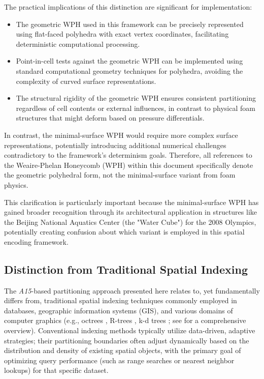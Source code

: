 \documentclass[10pt]{article}
\def\AAAB{\textit{A15}}
\begin{document}
The practical implications of this distinction are significant for implementation:
\begin{itemize}
    \item The geometric WPH used in this framework can be precisely represented using flat-faced polyhedra with exact vertex coordinates, facilitating deterministic computational processing.
    \item Point-in-cell tests against the geometric WPH can be implemented using standard computational geometry techniques for polyhedra, avoiding the complexity of curved surface representations.
    \item The structural rigidity of the geometric WPH ensures consistent partitioning regardless of cell contents or external influences, in contrast to physical foam structures that might deform based on pressure differentials.
\end{itemize}

In contrast, the minimal-surface WPH would require more complex surface representations, potentially introducing additional numerical challenges contradictory to the framework's determinism goals. Therefore, all references to the Weaire-Phelan Honeycomb (WPH) within this document specifically denote the geometric polyhedral form, not the minimal-surface variant from foam physics.

This clarification is particularly important because the minimal-surface WPH has gained broader recognition through its architectural application in structures like the Beijing National Aquatics Center (the "Water Cube") for the 2008 Olympics, potentially creating confusion about which variant is employed in this spatial encoding framework.

\subsection{Distinction from Traditional Spatial Indexing}\label{subsec-comparison-indexing}

The \AAAB{}-based partitioning approach presented here relates to, yet fundamentally differs from, traditional spatial indexing techniques commonly employed in databases, geographic information systems (GIS), and various domains of computer graphics (e.g., octrees \cite{Finkel1974}, R-trees \cite{Guttman1984}, k-d trees \cite{Bentley1975}; see \cite{Samet1990} for a comprehensive overview). Conventional indexing methods typically utilize data-driven, adaptive strategies; their partitioning boundaries often adjust dynamically based on the distribution and density of existing spatial objects, with the primary goal of optimizing query performance (such as range searches or nearest neighbor lookups) for that specific dataset.
\end{document}
